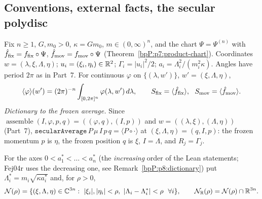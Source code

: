 \subsection{Conventions, external facts, the secular polydisc}\label{bpP:p8:conv}

Fix $n\ge1$, $G,m_0>0$, $\kappa=Gm_0$, $m\in(0,\infty)^n$, and the chart $\Psi=\Psi^{(n)}$ with $\hat f_{\rm fix}=f_{\rm fix}\circ\Psi$, $\hat f_{\rm mov}=f_{\rm mov}\circ\Psi$ (Theorem~\ref{bpP:p7:product-chart}). Coordinates $w=(\lambda,\xi,\Lambda,\eta)$; $u_i=(\xi_i,\eta_i)\in\mathbb{R}^2$; $\Gamma_i=|u_i|^2/2$; $a_i=\Lambda_i^2/(m_i^2\kappa)$. Angles have period $2\pi$ as in Part~7. For continuous $\varphi$ on $\{(\lambda,w')\}$, $w'=(\xi,\Lambda,\eta)$,
\[\langle\varphi\rangle(w')=(2\pi)^{-n}\int_{[0,2\pi]^n}\varphi(\lambda,w')\,d\lambda,\qquad S_{\rm fix}=\langle\hat f_{\rm fix}\rangle,\ \ S_{\rm mov}=\langle\hat f_{\rm mov}\rangle .\]
\emph{Dictionary to the frozen average.} Since $\operatorname{assemble}(I,\varphi,p,q)=((\varphi,q),(I,p))$ and $w=((\lambda,\xi),(\Lambda,\eta))$ (Part~7), $\texttt{secularAverage}\,P\,\mu\,I\,p\,q=\langle P\circ\cdot\rangle$ at $(\xi,\Lambda,\eta)=(q,I,p)$: the frozen momentum $p$ is $\eta$, the frozen position $q$ is $\xi$, $I=\Lambda$, and $R_j=\Gamma_j$.

For the axes $0<a_1^*<\dots<a_n^*$ (the \emph{increasing} order of the Lean statements; Fej04r uses the decreasing one, see Remark~\ref{bpP:p8:dictionary}) put $\Lambda_i^*=m_i\sqrt{\kappa a_i^*}$ and, for $\rho>0$,
\[\mathcal N(\rho)=\{(\xi,\Lambda,\eta)\in\C^{3n}:\ |\xi_i|,|\eta_i|<\rho,\ |\Lambda_i-\Lambda_i^*|<\rho\ \ \forall i\},\qquad \mathcal N_{\R}(\rho)=\mathcal N(\rho)\cap\R^{3n}.\]

